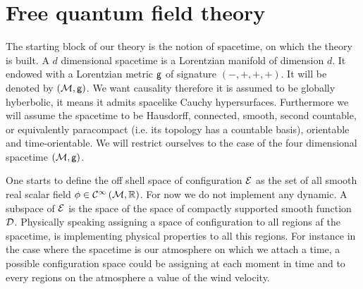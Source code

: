 


\tableofcontents

\chapter{Free quantum field theory} \label{chp:freeQFT}

The starting block of our theory is the notion of spacetime, on which the theory is built. A $d$ dimensional spacetime is a Lorentzian manifold of dimension $d$. It endowed with a Lorentzian metric $\mathsf{g}$ of signature $(-,+,+,+)$. It will be denoted by $\left(\mathcal{M},\mathsf{g}\right)$. We want causality therefore it is assumed to be globally hyberbolic, it means it admits spacelike Cauchy hypersurfaces. Furthermore we will assume the spacetime to be Hausdorff, connected, smooth, second countable, or equivalently paracompact (i.e. its topology has a countable basis), orientable and time-orientable. We will restrict ourselves to the case of the four dimensional spacetime $\left(\mathcal{M},\mathsf{g}\right)$.\par%

One starts to define the off shell space of configuration $\mathcal{E}$ as the set of all smooth real scalar field $\phi \in \mathcal{C}^\infty\left(\mathcal{M},\mathbb{R}\right)$. For now we do not implement any dynamic. A subspace of $\mathcal{E}$ is the space of the space of compactly supported smooth function $\mathcal{D}$. Physically speaking assigning a space of configuration to all regions af the spacetime, is implementing physical properties to all this regions. For instance in the case where the spacetime is our atmosphere on which we attach a time, a possible configuration space could be assigning at each moment in time and to every regions on the atmosphere a value of the wind velocity.\par%


